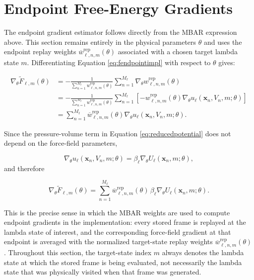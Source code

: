 \section{Endpoint Free-Energy Gradients}

The endpoint gradient estimator follows directly from the MBAR expression above. This section remains entirely in the physical parameters $\theta$ and uses the endpoint replay weights $\overline{w}^{\mathrm{rep}}_{\ell,n,m}(\theta)$ associated with a chosen target lambda state $m$. Differentiating Equation \eqref{eq:fendpointimpl} with respect to $\theta$ gives:

\begin{align}
    \nabla_\theta \widetilde{F}_{\ell,m}(\theta)
    &=
    -\frac{1}{
        \sum_{n=1}^{M_\ell} w^{\mathrm{rep}}_{\ell,n,m}(\theta)
    }
    \sum_{n=1}^{M_\ell}
    \nabla_\theta w^{\mathrm{rep}}_{\ell,n,m}(\theta)
    \nonumber \\
    &=
    -\frac{1}{
        \sum_{n=1}^{M_\ell} w^{\mathrm{rep}}_{\ell,n,m}(\theta)
    }
    \sum_{n=1}^{M_\ell}
    \left[
        -w^{\mathrm{rep}}_{\ell,n,m}(\theta)
        \nabla_\theta
        u_\ell(\mathbf{x}_n, V_n, m; \theta)
    \right]
    \nonumber \\
    &=
    \sum_{n=1}^{M_\ell}
    \overline{w}^{\mathrm{rep}}_{\ell,n,m}(\theta)
    \nabla_\theta
    u_\ell(\mathbf{x}_n, V_n, m; \theta).
    \label{eq:fgradred}
\end{align}

Since the pressure-volume term in Equation \eqref{eq:reducedpotential} does not depend on the force-field parameters,

\begin{equation}
    \nabla_\theta
    u_\ell(\mathbf{x}_n, V_n, m; \theta)
    =
    \beta_\ell
    \nabla_\theta
    U_\ell(\mathbf{x}_n, m; \theta),
    \label{eq:gradreduced}
\end{equation}
%
and therefore

\begin{equation}
    \nabla_\theta \widetilde{F}_{\ell,m}(\theta)
    =
    \sum_{n=1}^{M_\ell}
    \overline{w}^{\mathrm{rep}}_{\ell,n,m}(\theta)
    \,
    \beta_\ell
    \nabla_\theta
    U_\ell(\mathbf{x}_n, m; \theta).
    \label{eq:fgradtheta}
\end{equation}

This is the precise sense in which the MBAR weights are used to compute endpoint gradients in the implementation: every stored frame is replayed at the lambda state of interest, and the corresponding force-field gradient at that endpoint is averaged with the normalized target-state replay weights $\overline{w}^{\mathrm{rep}}_{\ell,n,m}(\theta)$. Throughout this section, the target-state index $m$ always denotes the lambda state at which the stored frame is being evaluated, not necessarily the lambda state that was physically visited when that frame was generated.

